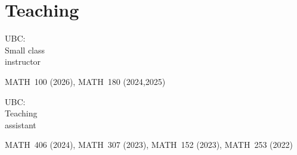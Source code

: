 \documentclass[10pt,a4paper]{article}
\newcommand{\entry}[2]{%
  \noindent\parbox[t]{3cm}{\raggedright\strut #1}%
  \parbox[t]{\dimexpr\linewidth-3cm}{#2}\par\vspace{0.35em}}
\begin{document}
\section{Teaching}
\entry{UBC: \\ Small class \\ instructor }{MATH~100 (2026), MATH~180 (2024,2025)}
\entry{UBC: \\ Teaching \\ assistant}{MATH~406 (2024), MATH~307 (2023), MATH~152 (2023), MATH~253 (2022)}

\end{document}
